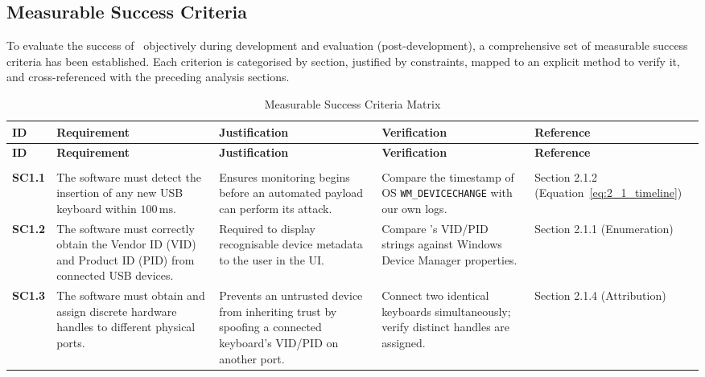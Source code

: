 \subsection{Measurable Success Criteria}

To evaluate the success of \projectNameFormatted\ objectively during development and evaluation (post-development), a comprehensive set of measurable success criteria has been established. Each criterion is categorised by section, justified by constraints, mapped to an explicit method to verify it, and cross-referenced with the preceding analysis sections.

	{\small
		\renewcommand{\arraystretch}{1.2}
		\begin{xltabular}{\textwidth}{@{} l P{3.0cm} L L P{2.2cm} @{}}
			\caption{Measurable Success Criteria Matrix} \label{tab:success_criteria} \\
			\toprule
			\textbf{ID} & \textbf{Requirement} & \textbf{Justification} & \textbf{Verification} & \textbf{Reference} \\
			\midrule
			\endfirsthead

			\toprule
			\textbf{ID} & \textbf{Requirement} & \textbf{Justification} & \textbf{Verification} & \textbf{Reference} \\
			\midrule
			\endhead


			 \\
			\midrule

			\textbf{SC1.1} &
			The software must detect the insertion of any new USB keyboard within $100\,\text{ms}$. &
			Ensures monitoring begins before an automated payload can perform its attack. &
			Compare the timestamp of OS \texttt{WM\_DEVICECHANGE} with our own logs. &
			Section 2.1.2 (Equation~\ref{eq:2_1_timeline}) \\

			\textbf{SC1.2} &
			The software must correctly obtain the Vendor ID (VID) and Product ID (PID) from connected USB devices. &
			Required to display recognisable device metadata to the user in the UI. &
			Compare \projectNameFormatted's VID/PID strings against Windows Device Manager properties. &
			Section 2.1.1 (Enumeration) \\

			\textbf{SC1.3} &
			The software must obtain and assign discrete hardware handles to different physical ports. &
			Prevents an untrusted device from inheriting trust by spoofing a connected keyboard's VID/PID on another port. &
			Connect two identical keyboards simultaneously; verify distinct handles are assigned. &
			Section 2.1.4 (Attribution) \\


\end{xltabular}}

